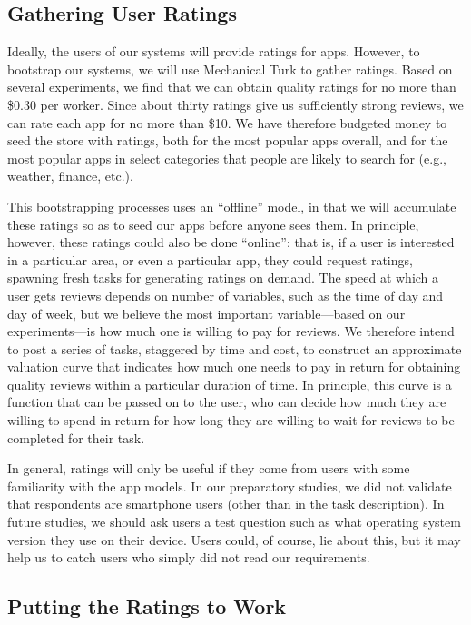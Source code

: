\documentclass[11pt]{article}
\begin{document}
\subsection{Gathering User Ratings}
\label{subsec-gather-ratings}

Ideally, the users of our systems will provide ratings for
apps. However, 
to bootstrap our systems, we will use Mechanical Turk to gather
ratings. Based on several experiments, we find that we can obtain
quality ratings for no more than \$0.30 per worker. Since about thirty
ratings give us sufficiently strong reviews, we can rate each
app for no more than \$10. We have therefore budgeted money to
seed the store with ratings, both for the most popular apps overall,
and for the most popular apps in select categories that people are
likely to search for (e.g., weather, finance, etc.).

This bootstrapping processes uses an ``offline'' model, in that we
will accumulate these ratings so as to seed our apps before anyone
sees them. In principle, however, these ratings could also be done
``online'': that is, if a user is interested in a particular area, or
even a particular app, they could request ratings, spawning fresh tasks for
generating ratings on demand. The speed at which a user gets reviews
depends on number of variables, such as the time of day and day of
week, but we believe the most important variable---based on our
experiments---is how much one is willing to pay for reviews. We
therefore intend to post a series of tasks, staggered by time and
cost, to construct an approximate valuation curve that indicates how
much one needs to pay in return for obtaining quality reviews within a
particular duration of time. In principle, this curve is a function
that can be passed on to the user, who can decide how much they are
willing to spend in return for how long they are willing to wait for
reviews to be completed for their task.

In general, ratings will only be useful if they come from users with some
familiarity with the app models.
In our preparatory studies, we did not validate that respondents are
smartphone users (other than in the task description). In future
studies, we should ask users a test question such as what operating
system version they use on their device. Users could, of course, lie
about this, but it may help us to catch users who simply did not read
our requirements.

\subsection{Putting the Ratings to Work}
\label{subsec-app-selection}
\end{document}
